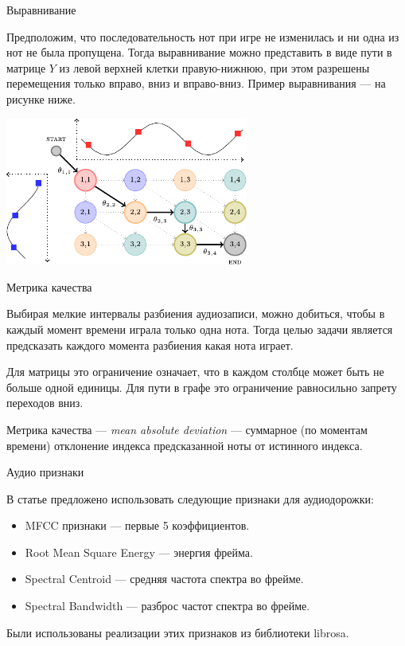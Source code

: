 \documentclass[unicode, dvipsnames]{beamer}
\begin{document}
\begin{frame}{Выравнивание}

Предположим, что последовательность нот при игре не изменилась и ни одна из нот не была пропущена. Тогда выравнивание можно представить в виде пути в матрице $Y$ из левой верхней клетки правую-нижнюю, при этом разрешены перемещения только вправо, вниз и вправо-вниз. Пример выравнивания --- на рисунке ниже.

\bigskip
\centering
\includegraphics[width=0.6\textwidth]{graphics/align_example.pdf}

\end{frame}

\begin{frame}{Метрика качества}

Выбирая мелкие интервалы разбиения аудиозаписи, можно добиться, чтобы в каждый момент времени играла только одна нота. Тогда целью задачи является предсказать каждого момента разбиения какая нота играет. 

\bigskip
Для матрицы это ограничение означает, что в каждом столбце может быть не больше одной единицы. Для пути в графе это ограничение равносильно запрету переходов вниз.

\bigskip
Метрика качества --- \textit{mean absolute deviation} --- суммарное (по моментам времени) отклонение индекса предсказанной ноты от истинного индекса.

\end{frame}

\begin{frame}{Аудио признаки}

В статье предложено использовать следующие признаки для аудиодорожки:

\bigskip
\begin{itemize}
	\item MFCC признаки --- первые 5 коэффициентов.
	\item Root Mean Square Energy --- энергия фрейма.
	\item Spectral Centroid --- средняя частота спектра во фрейме.
	\item Spectral Bandwidth --- разброс частот спектра во фрейме.
\end{itemize}

\bigskip
Были использованы реализации этих признаков из библиотеки librosa.

\end{frame}
\end{document}
